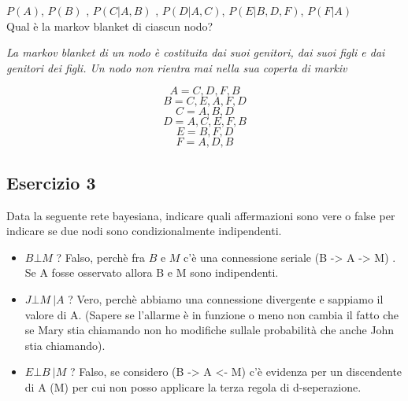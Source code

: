 \documentclass{article}
\begin{document}
\(P(A)\), \(P(B)\) , \(P(C | A, B)\) , \(P(D | A, C)\), \(P(E | B, D, F)\),  \(P(F | A)\)
\\
\vspace{0.3cm}
Qual è la markov blanket di ciascun nodo?

\textit{La markov blanket di un nodo è costituita dai suoi genitori, dai suoi figli e dai genitori dei figli. Un nodo non rientra mai nella sua coperta di markiv}

 \[A = { C, D, F, B }\]
 \[B = { C, E, A, F, D }\]
 \[C = { A, B, D }\]
 \[D = { A, C, E, F, B }\]
 \[E = { B, F, D }\]
 \[F = { A, D, B }\]
 
 \pagebreak
\subsection{Esercizio 3}

Data la seguente rete bayesiana, indicare quali affermazioni sono vere o false per indicare se due nodi sono condizionalmente indipendenti. \\

\begin{center}
\end{center}

\begin{itemize}
	\item \( B \bot M\) ?
	Falso, perchè  fra \(B\) e \(M\) c'è una connessione seriale (B -> A -> M) .
	Se A fosse osservato allora B e M sono indipendenti.
	
 \end{itemize}

\begin{itemize}
	\item \( J \bot M\ | A \) ?
	Vero, perchè abbiamo una connessione divergente e sappiamo il valore di A.
	(Sapere se l'allarme è in funzione  o meno non cambia il fatto che se Mary stia chiamando non ho modifiche sullale probabilità che anche John stia chiamando).

\end{itemize}

\begin{itemize}
	\item \( E \bot B\ | M \) ?
	Falso, se considero (B -> A <- M) c'è evidenza per un discendente di A (M) per cui non posso applicare la terza regola di d-seperazione.
	
\end{itemize}
\end{document}
